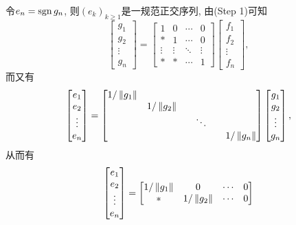 \begin{Proof}
    令$ e_n=\mathrm{sgn}\, g_n $, 则$ (e_k)_{k\geqslant 1} $是一规范正交序列, 由(Step 1)可知
    \[
    \begin{bmatrix}
    g_1\\g_2\\\vdots\\g_n
    \end{bmatrix}=\begin{bmatrix}
    1 & 0 & \cdots & 0\\ \ast & 1 & \cdots & 0 \\ \vdots & \vdots & \ddots & \vdots\\ \ast & \ast & \cdots & 1
    \end{bmatrix}\begin{bmatrix}
    f_1\\ f_2\\\vdots\\f_n
    \end{bmatrix},
    \]
    而又有
    \[
    \begin{bmatrix}
    e_1\\e_2\\\vdots\\e_n
    \end{bmatrix}=\begin{bmatrix}
    1/\norm{g_1} & \phantom{1/\norm{g_1}} & \phantom{1/\norm{g_1}} & \phantom{1/\norm{g_1}}\\
    \phantom{1/\norm{g_1}} & 1/\norm{g_2} & \phantom{1/\norm{g_1}} & \phantom{1/\norm{g_1}}\\
    \phantom{1/\norm{g_1}} & \phantom{1/\norm{g_1}} & \ddots & \phantom{1/\norm{g_1}}\\
    \phantom{1/\norm{g_1}} & \phantom{1/\norm{g_1}} & \phantom{1/\norm{g_1}} & 1/\norm{g_n}
    \end{bmatrix}\begin{bmatrix}
    g_1\\g_2\\\vdots\\g_n
    \end{bmatrix},
    \]
    从而有
    \[
    \begin{bmatrix}
    e_1\\e_2\\\vdots\\e_n
    \end{bmatrix}=\begin{bmatrix}
    1/\left\| g_1 \right\| & 0 & \cdots & 0\\
    \ast & 1/\left\| g_2 \right\| & \cdots & 0\\

\end{bmatrix}\]
\end{Proof}
